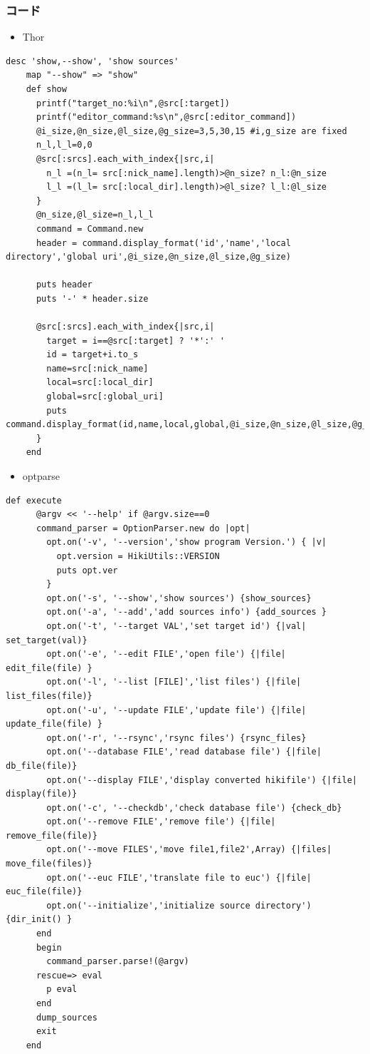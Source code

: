 \subsubsection{コード}\begin{itemize}
\item Thor
\end{itemize}\begin{lstlisting}[style=customRuby]
    desc 'show,--show', 'show sources'
    map "--show" => "show"
    def show
      printf("target_no:%i\n",@src[:target])
      printf("editor_command:%s\n",@src[:editor_command])
      @i_size,@n_size,@l_size,@g_size=3,5,30,15 #i,g_size are fixed             
      n_l,l_l=0,0
      @src[:srcs].each_with_index{|src,i|
        n_l =(n_l= src[:nick_name].length)>@n_size? n_l:@n_size
        l_l =(l_l= src[:local_dir].length)>@l_size? l_l:@l_size
      }
      @n_size,@l_size=n_l,l_l
      command = Command.new
      header = command.display_format('id','name','local directory','global uri',@i_size,@n_size,@l_size,@g_size)

      puts header
      puts '-' * header.size

      @src[:srcs].each_with_index{|src,i|
        target = i==@src[:target] ? '*':' '
        id = target+i.to_s
        name=src[:nick_name]
        local=src[:local_dir]
        global=src[:global_uri]
        puts command.display_format(id,name,local,global,@i_size,@n_size,@l_size,@g_size)
      }
    end
\end{lstlisting}\begin{itemize}
\item optparse
\end{itemize}\begin{lstlisting}[style=customRuby]
    def execute
      @argv << '--help' if @argv.size==0
      command_parser = OptionParser.new do |opt|
        opt.on('-v', '--version','show program Version.') { |v|
          opt.version = HikiUtils::VERSION
          puts opt.ver
        }
        opt.on('-s', '--show','show sources') {show_sources}
        opt.on('-a', '--add','add sources info') {add_sources }
        opt.on('-t', '--target VAL','set target id') {|val| set_target(val)}
        opt.on('-e', '--edit FILE','open file') {|file| edit_file(file) }
        opt.on('-l', '--list [FILE]','list files') {|file| list_files(file)}
        opt.on('-u', '--update FILE','update file') {|file| update_file(file) }
        opt.on('-r', '--rsync','rsync files') {rsync_files}
        opt.on('--database FILE','read database file') {|file| db_file(file)}
        opt.on('--display FILE','display converted hikifile') {|file| display(file)}
        opt.on('-c', '--checkdb','check database file') {check_db}
        opt.on('--remove FILE','remove file') {|file| remove_file(file)}
        opt.on('--move FILES','move file1,file2',Array) {|files| move_file(files)}
        opt.on('--euc FILE','translate file to euc') {|file| euc_file(file)}
        opt.on('--initialize','initialize source directory') {dir_init() }
      end
      begin
        command_parser.parse!(@argv)
      rescue=> eval
        p eval
      end
      dump_sources
      exit
    end    
    

\end{lstlisting}
